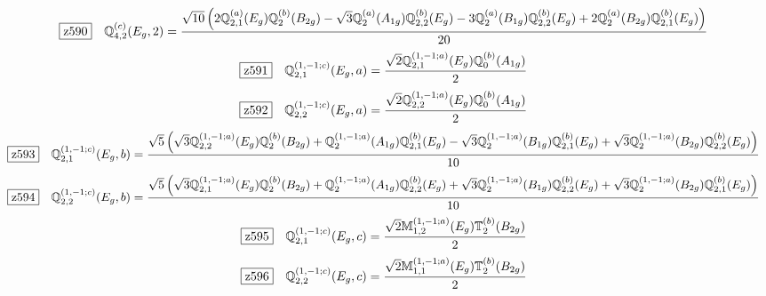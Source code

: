 \documentclass[fleqn,10pt,landscape]{jsarticle}
\begin{document}
\begin{dmath*}
\hspace*{3mm}\fbox{z590}\quad \mathbb{Q}_{4,2}^{(c)}(E_{g},2)=\frac{\sqrt{10} \left(2 \mathbb{Q}_{2,1}^{(a)}(E_{g}) \mathbb{Q}_{2}^{(b)}(B_{2g}) - \sqrt{3} \mathbb{Q}_{2}^{(a)}(A_{1g}) \mathbb{Q}_{2,2}^{(b)}(E_{g}) - 3 \mathbb{Q}_{2}^{(a)}(B_{1g}) \mathbb{Q}_{2,2}^{(b)}(E_{g}) + 2 \mathbb{Q}_{2}^{(a)}(B_{2g}) \mathbb{Q}_{2,1}^{(b)}(E_{g})\right)}{20}
\end{dmath*}
\begin{dmath*}
\hspace*{3mm}\fbox{z591}\quad \mathbb{Q}_{2,1}^{(1,-1;c)}(E_{g},a)=\frac{\sqrt{2} \mathbb{Q}_{2,1}^{(1,-1;a)}(E_{g}) \mathbb{Q}_{0}^{(b)}(A_{1g})}{2}
\end{dmath*}
\begin{dmath*}
\hspace*{3mm}\fbox{z592}\quad \mathbb{Q}_{2,2}^{(1,-1;c)}(E_{g},a)=\frac{\sqrt{2} \mathbb{Q}_{2,2}^{(1,-1;a)}(E_{g}) \mathbb{Q}_{0}^{(b)}(A_{1g})}{2}
\end{dmath*}
\begin{dmath*}
\hspace*{3mm}\fbox{z593}\quad \mathbb{Q}_{2,1}^{(1,-1;c)}(E_{g},b)=\frac{\sqrt{5} \left(\sqrt{3} \mathbb{Q}_{2,2}^{(1,-1;a)}(E_{g}) \mathbb{Q}_{2}^{(b)}(B_{2g}) + \mathbb{Q}_{2}^{(1,-1;a)}(A_{1g}) \mathbb{Q}_{2,1}^{(b)}(E_{g}) - \sqrt{3} \mathbb{Q}_{2}^{(1,-1;a)}(B_{1g}) \mathbb{Q}_{2,1}^{(b)}(E_{g}) + \sqrt{3} \mathbb{Q}_{2}^{(1,-1;a)}(B_{2g}) \mathbb{Q}_{2,2}^{(b)}(E_{g})\right)}{10}
\end{dmath*}
\begin{dmath*}
\hspace*{3mm}\fbox{z594}\quad \mathbb{Q}_{2,2}^{(1,-1;c)}(E_{g},b)=\frac{\sqrt{5} \left(\sqrt{3} \mathbb{Q}_{2,1}^{(1,-1;a)}(E_{g}) \mathbb{Q}_{2}^{(b)}(B_{2g}) + \mathbb{Q}_{2}^{(1,-1;a)}(A_{1g}) \mathbb{Q}_{2,2}^{(b)}(E_{g}) + \sqrt{3} \mathbb{Q}_{2}^{(1,-1;a)}(B_{1g}) \mathbb{Q}_{2,2}^{(b)}(E_{g}) + \sqrt{3} \mathbb{Q}_{2}^{(1,-1;a)}(B_{2g}) \mathbb{Q}_{2,1}^{(b)}(E_{g})\right)}{10}
\end{dmath*}
\begin{dmath*}
\hspace*{3mm}\fbox{z595}\quad \mathbb{Q}_{2,1}^{(1,-1;c)}(E_{g},c)=\frac{\sqrt{2} \mathbb{M}_{1,2}^{(1,-1;a)}(E_{g}) \mathbb{T}_{2}^{(b)}(B_{2g})}{2}
\end{dmath*}
\begin{dmath*}
\hspace*{3mm}\fbox{z596}\quad \mathbb{Q}_{2,2}^{(1,-1;c)}(E_{g},c)=\frac{\sqrt{2} \mathbb{M}_{1,1}^{(1,-1;a)}(E_{g}) \mathbb{T}_{2}^{(b)}(B_{2g})}{2}
\end{dmath*}
\end{document}
